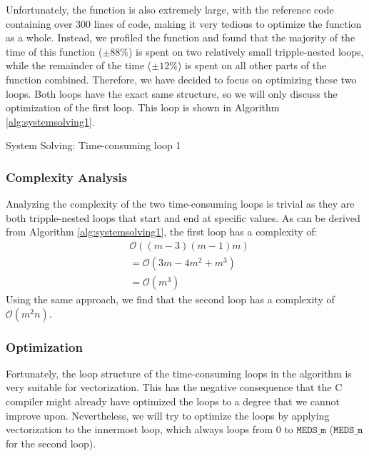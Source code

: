\documentclass[11pt,a4paper]{report}
\theoremstyle{definition}
\begin{document}
Unfortunately, the function is also extremely large, with the reference code containing over 300 lines of code, making it very tedious to optimize the function as a whole. Instead, we profiled the function and found that the majority of the time of this function ($\pm 88 \%$) is spent on two relatively small tripple-nested loops, while the remainder of the time ($\pm 12 \%$) is spent on all other parts of the function combined. Therefore, we have decided to focus on optimizing these two loops. Both loops have the exact same structure, so we will only discuss the optimization of the first loop. This loop is shown in Algorithm \ref{alg:systemsolving1}.

\begin{algorithm}
  \caption{System Solving: Time-consuming loop 1}
  \label{alg:systemsolving1}
  
\end{algorithm}

\subsubsection{Complexity Analysis}
\label{sec:systemsolvingcomplexity}
Analyzing the complexity of the two time-consuming loops is trivial as they are both tripple-nested loops that start and end at specific values. As can be derived from Algorithm \ref{alg:systemsolving1}, the first loop has a complexity of:
\begin{align*}
  & \mathcal{O}((m-3)(m-1)m) \\
  & = \mathcal{O}(3m - 4m^2 + m^3) \\
  & = \mathcal{O}(m^3)
\end{align*}
Using the same approach, we find that the second loop has a complexity of $\mathcal{O}(m^2n)$.

\subsubsection{Optimization}
\label{sec:systemsolvingoptimization}
Fortunately, the loop structure of the time-consuming loops in the algorithm is very suitable for vectorization. This has the negative consequence that the C compiler might already have optimized the loops to a degree that we cannot improve upon. Nevertheless, we will try to optimize the loops by applying vectorization to the innermost loop, which always loops from $0$ to $\texttt{MEDS\_m}$ ($\texttt{MEDS\_n}$ for the second loop).
\end{document}
